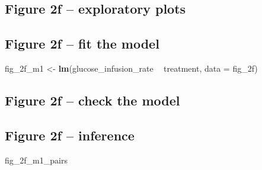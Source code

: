 \documentclass[]{book}
\newenvironment{Shaded}{\begin{snugshade}}{\end{snugshade}}
\newcommand{\DataTypeTok}[1]{\textcolor[rgb]{0.13,0.29,0.53}{#1}}
\newcommand{\KeywordTok}[1]{\textcolor[rgb]{0.13,0.29,0.53}{\textbf{#1}}}
\newcommand{\NormalTok}[1]{#1}
\newcommand{\OperatorTok}[1]{\textcolor[rgb]{0.81,0.36,0.00}{\textbf{#1}}}
\newcommand{\OtherTok}[1]{\textcolor[rgb]{0.56,0.35,0.01}{#1}}
\newcommand{\StringTok}[1]{\textcolor[rgb]{0.31,0.60,0.02}{#1}}
\begin{document}
\hypertarget{figure-2f-exploratory-plots}{%
\subsection{Figure 2f -- exploratory plots}\label{figure-2f-exploratory-plots}}

\hypertarget{figure-2f-fit-the-model}{%
\subsection{Figure 2f -- fit the model}\label{figure-2f-fit-the-model}}

\begin{Shaded}
\begin{Highlighting}[]
\NormalTok{fig_2f_m1 <-}\StringTok{ }\KeywordTok{lm}\NormalTok{(glucose_infusion_rate }\OperatorTok{~}\StringTok{ }\NormalTok{treatment, }\DataTypeTok{data =}\NormalTok{ fig_2f)}
\end{Highlighting}
\end{Shaded}

\hypertarget{figure-2f-check-the-model}{%
\subsection{Figure 2f -- check the model}\label{figure-2f-check-the-model}}

\hypertarget{figure-2f-inference}{%
\subsection{Figure 2f -- inference}\label{figure-2f-inference}}

\begin{Shaded}
\end{Shaded}

\begin{Shaded}
\begin{Highlighting}[]
\NormalTok{fig_2f_m1_pairs}
\end{Highlighting}
\end{Shaded}
\end{document}
